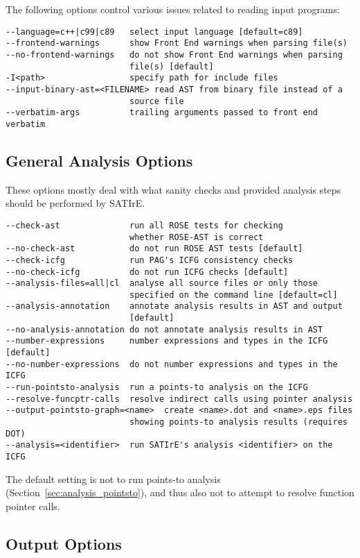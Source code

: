 \documentclass[a4paper,12pt]{report}
\begin{document}
The following options control various issues related to reading input
programs:
{\footnotesize
\begin{verbatim}
--language=c++|c99|c89   select input language [default=c89]
--frontend-warnings      show Front End warnings when parsing file(s)
--no-frontend-warnings   do not show Front End warnings when parsing
                         file(s) [default]
-I<path>                 specify path for include files
--input-binary-ast=<FILENAME> read AST from binary file instead of a
                         source file
--verbatim-args          trailing arguments passed to front end verbatim
\end{verbatim}
}

\subsection{General Analysis Options}

These options mostly deal with what sanity checks and provided analysis
steps should be performed by SATIrE.

{\footnotesize
\begin{verbatim}
--check-ast              run all ROSE tests for checking
                         whether ROSE-AST is correct
--no-check-ast           do not run ROSE AST tests [default]
--check-icfg             run PAG's ICFG consistency checks
--no-check-icfg          do not run ICFG checks [default]
--analysis-files=all|cl  analyse all source files or only those
                         specified on the command line [default=cl]
--analysis-annotation    annotate analysis results in AST and output
                         [default]
--no-analysis-annotation do not annotate analysis results in AST
--number-expressions     number expressions and types in the ICFG [default]
--no-number-expressions  do not number expressions and types in the ICFG
--run-pointsto-analysis  run a points-to analysis on the ICFG
--resolve-funcptr-calls  resolve indirect calls using pointer analysis
--output-pointsto-graph=<name>  create <name>.dot and <name>.eps files
                         showing points-to analysis results (requires DOT)
--analysis=<identifier>  run SATIrE's analysis <identifier> on the ICFG
\end{verbatim}
}

The default setting is not to run points-to analysis
(Section~\ref{sec:analysis_pointsto}), and thus also not to attempt to
resolve function pointer calls.

\subsection{Output Options}
\end{document}

